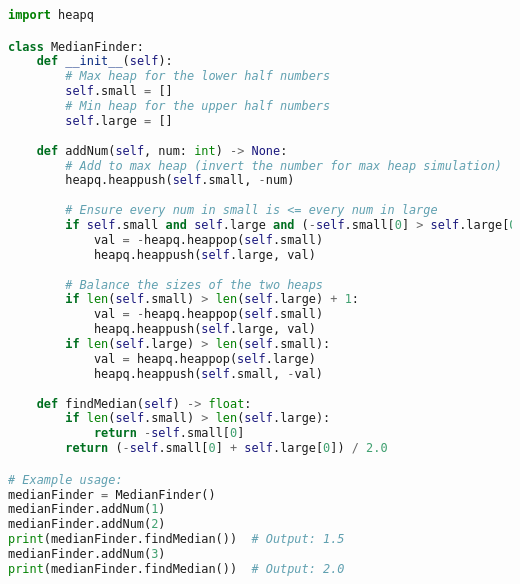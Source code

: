 \begin{fullwidth}
\begin{lstlisting}[language=Python]
import heapq

class MedianFinder:
    def __init__(self):
        # Max heap for the lower half numbers
        self.small = []
        # Min heap for the upper half numbers
        self.large = []
    
    def addNum(self, num: int) -> None:
        # Add to max heap (invert the number for max heap simulation)
        heapq.heappush(self.small, -num)
        
        # Ensure every num in small is <= every num in large
        if self.small and self.large and (-self.small[0] > self.large[0]):
            val = -heapq.heappop(self.small)
            heapq.heappush(self.large, val)
        
        # Balance the sizes of the two heaps
        if len(self.small) > len(self.large) + 1:
            val = -heapq.heappop(self.small)
            heapq.heappush(self.large, val)
        if len(self.large) > len(self.small):
            val = heapq.heappop(self.large)
            heapq.heappush(self.small, -val)
    
    def findMedian(self) -> float:
        if len(self.small) > len(self.large):
            return -self.small[0]
        return (-self.small[0] + self.large[0]) / 2.0

# Example usage:
medianFinder = MedianFinder()
medianFinder.addNum(1)
medianFinder.addNum(2)
print(medianFinder.findMedian())  # Output: 1.5
medianFinder.addNum(3)
print(medianFinder.findMedian())  # Output: 2.0
\end{lstlisting}
\end{fullwidth}

